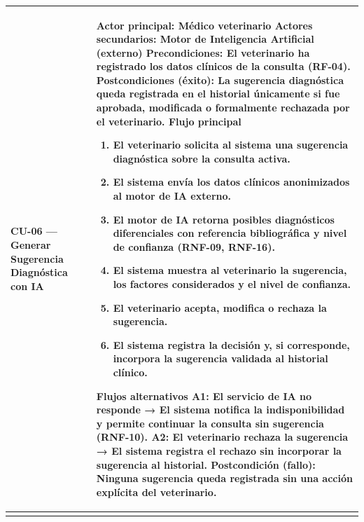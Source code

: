 \documentclass[
]{article}
\newcounter{none} %
\begin{document}
{\def\LTcaptype{none} %
\begin{longtable}[]{|
  >{\raggedright\arraybackslash}p{}|
  >{\raggedright\arraybackslash}p{}|}
\hline
\begin{minipage}[b]{\linewidth}\raggedright
\textbf{CU-06 --- Generar Sugerencia Diagnóstica con IA}
\end{minipage} & \begin{minipage}[b]{\linewidth}\raggedright
\textbf{Actor principal:} Médico veterinario \textbf{Actores
secundarios:} Motor de Inteligencia Artificial (externo)
\textbf{Precondiciones:} El veterinario ha registrado los datos clínicos
de la consulta (RF-04). \textbf{Postcondiciones (éxito):} La sugerencia diagnóstica queda
registrada en el historial únicamente si fue aprobada, modificada o
formalmente rechazada por el veterinario. \textbf{Flujo principal}

\begin{enumerate}
\def\labelenumi{\arabic{enumi}.}
\item
  El veterinario solicita al sistema una sugerencia diagnóstica sobre la
  consulta activa.
\item
  El sistema envía los datos clínicos anonimizados al motor de IA
  externo.
\item
  El motor de IA retorna posibles diagnósticos diferenciales con
  referencia bibliográfica y nivel de confianza (RNF-09, RNF-16).
\item
  El sistema muestra al veterinario la sugerencia, los factores
  considerados y el nivel de confianza.
\item
  El veterinario acepta, modifica o rechaza la sugerencia.
\item
  El sistema registra la decisión y, si corresponde, incorpora la
  sugerencia validada al historial clínico.
\end{enumerate}

\textbf{Flujos alternativos} A1: El servicio de IA no responde → El sistema notifica la
indisponibilidad y permite continuar la consulta sin sugerencia
(RNF-10). A2: El veterinario rechaza la sugerencia → El sistema registra el
rechazo sin incorporar la sugerencia al historial. \textbf{Postcondición (fallo):} Ninguna sugerencia queda registrada sin
una acción explícita del veterinario.
\end{minipage} \\
\hline
\endhead
\hline
\endlastfoot
\end{longtable}
}
\end{document}
